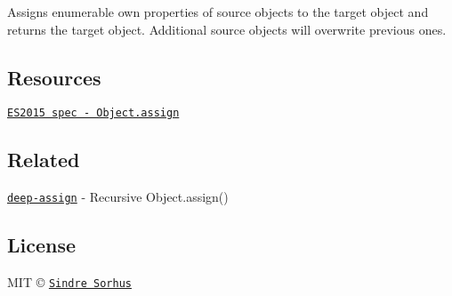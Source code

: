 Assigns enumerable own properties of {\ttfamily source} objects to the {\ttfamily target} object and returns the {\ttfamily target} object. Additional {\ttfamily source} objects will overwrite previous ones.

\subsection*{Resources}


\begin{DoxyItemize}
\item \href{https://people.mozilla.org/~jorendorff/es6-draft.html#sec-object.assign}{\tt E\+S2015 spec -\/ Object.\+assign}
\end{DoxyItemize}

\subsection*{Related}


\begin{DoxyItemize}
\item \href{https://github.com/sindresorhus/deep-assign}{\tt deep-\/assign} -\/ Recursive {\ttfamily Object.\+assign()}
\end{DoxyItemize}

\subsection*{License}

M\+IT © \href{https://sindresorhus.com}{\tt Sindre Sorhus} 